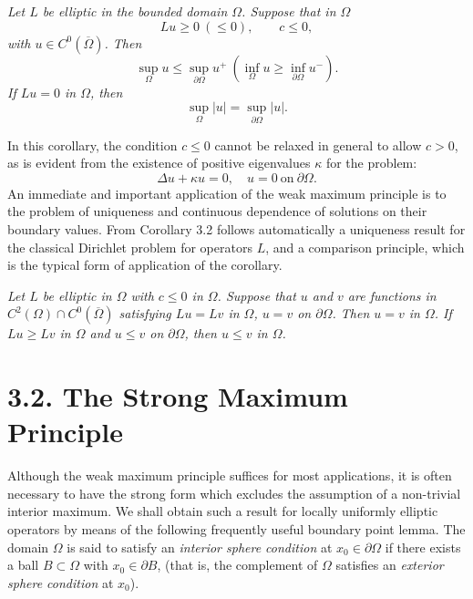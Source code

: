 \begin{corollary}\label{gt-ch3-cor-weak}
\textit{Let $L$ be elliptic in the bounded domain $\Omega$. Suppose that in $\Omega$}
\[
Lu\geq 0\ (\leq 0),\qquad c\leq 0,
\tag{3.7}
\]
\textit{with $u\in C^0(\overline{\Omega})$. Then}
\[
\sup_{\Omega} u\leq \sup_{\partial\Omega} u^+\ (\inf_{\Omega} u\geq \inf_{\partial\Omega} u^-).
\tag{3.8}
\]
\textit{If $Lu=0$ in $\Omega$, then}
\[
\sup_{\Omega} \lvert u\rvert=\sup_{\partial\Omega} \lvert u\rvert.
\tag{3.9}
\]
\end{corollary}

In this corollary, the condition $c\leq 0$ cannot be relaxed in general to allow $c>0$, as is evident from the existence of positive eigenvalues $\kappa$ for the problem:
\[
\Delta u+\kappa u=0,\quad u=0\ \text{on}\ \partial\Omega.
\]
An immediate and important application of the weak maximum principle is to the problem of uniqueness and continuous dependence of solutions on their boundary values. From Corollary 3.2 follows automatically a uniqueness result for the classical Dirichlet problem for operators $L$, and a comparison principle, which is the typical form of application of the corollary.

\begin{theorem}\label{gt-ch3-comparison}
\textit{Let $L$ be elliptic in $\Omega$ with $c\leq 0$ in $\Omega$. Suppose that $u$ and $v$ are functions in $C^2(\Omega)\cap C^0(\overline{\Omega})$ satisfying $Lu = Lv$ in $\Omega$, $u = v$ on $\partial\Omega$. Then $u = v$ in $\Omega$. If $Lu\geq Lv$ in $\Omega$ and $u\leq v$ on $\partial\Omega$, then $u\leq v$ in $\Omega$.}
\end{theorem}

\section*{3.2. The Strong Maximum Principle}

Although the weak maximum principle suffices for most applications, it is often necessary to have the strong form which excludes the assumption of a non-trivial interior maximum. We shall obtain such a result for locally uniformly elliptic operators by means of the following frequently useful boundary point lemma. The domain $\Omega$ is said to satisfy an \textit{interior sphere condition} at $x_0\in \partial\Omega$ if there exists a ball $B\subset \Omega$ with $x_0\in \partial B$, (that is, the complement of $\Omega$ satisfies an \textit{exterior sphere condition} at $x_0$).

